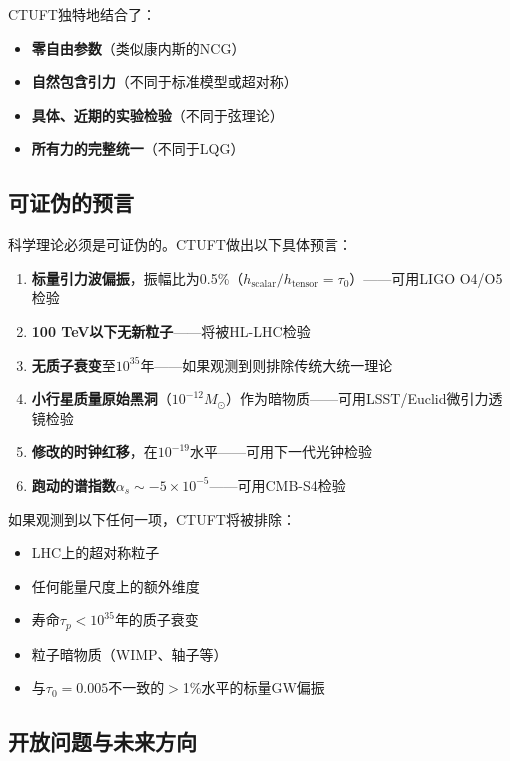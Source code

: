 CTUFT独特地结合了：
\begin{itemize}
    \item \textbf{零自由参数}（类似康内斯的NCG）
    \item \textbf{自然包含引力}（不同于标准模型或超对称）
    \item \textbf{具体、近期的实验检验}（不同于弦理论）
    \item \textbf{所有力的完整统一}（不同于LQG）
\end{itemize}

\subsection{可证伪的预言}

科学理论必须是可证伪的。CTUFT做出以下具体预言：

\begin{enumerate}
    \item \textbf{标量引力波偏振}，振幅比为0.5\%（$h_{\text{scalar}}/h_{\text{tensor}} = \tau_0$）——可用LIGO O4/O5检验
    
    \item \textbf{100 TeV以下无新粒子}——将被HL-LHC检验
    
    \item \textbf{无质子衰变}至$10^{35}$年——如果观测到则排除传统大统一理论
    
    \item \textbf{小行星质量原始黑洞}（$10^{-12} M_\odot$）作为暗物质——可用LSST/Euclid微引力透镜检验
    
    \item \textbf{修改的时钟红移}，在$10^{-19}$水平——可用下一代光钟检验
    
    \item \textbf{跑动的谱指数}$\alpha_s \sim -5\times 10^{-5}$——可用CMB-S4检验
\end{enumerate}

如果观测到以下任何一项，CTUFT将被排除：
\begin{itemize}
    \item LHC上的超对称粒子
    \item 任何能量尺度上的额外维度
    \item 寿命$\tau_p < 10^{35}$年的质子衰变
    \item 粒子暗物质（WIMP、轴子等）
    \item 与$\tau_0 = 0.005$不一致的$>$1\%水平的标量GW偏振
\end{itemize}

\subsection{开放问题与未来方向}

